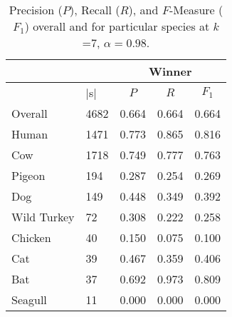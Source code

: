 \begin{table}[t]
\caption{Precision ($P$), Recall ($R$), and $F$-Measure ($F_1$) overall and for particular species at $k$=7, $\alpha=0.98$.}
\begin{tabular}{lllll}
\cline{3-5}
                                    & \multicolumn{1}{l|}{}             & \multicolumn{3}{c|}{Winner} \\ \hline
\multicolumn{1}{|l|}{\Spec{}}     & \multicolumn{1}{l|}{$|$\Isol{}s$|$} & \multicolumn{1}{c}{$P$} & \multicolumn{1}{c}{$R$} & \multicolumn{1}{c|}{$F_1$} \\ \hline
\multicolumn{1}{|l|}{Overall}       & \multicolumn{1}{l|}{4682}         & 0.664 & 0.664 & \multicolumn{1}{l|}{0.664} \\
\multicolumn{1}{|l|}{Human}         & \multicolumn{1}{l|}{1471}         & 0.773 & 0.865 & \multicolumn{1}{l|}{0.816} \\
\multicolumn{1}{|l|}{Cow}           & \multicolumn{1}{l|}{1718}         & 0.749 & 0.777 & \multicolumn{1}{l|}{0.763} \\
\multicolumn{1}{|l|}{Pigeon}        & \multicolumn{1}{l|}{194}          & 0.287 & 0.254 & \multicolumn{1}{l|}{0.269} \\
\multicolumn{1}{|l|}{Dog}           & \multicolumn{1}{l|}{149}          & 0.448 & 0.349 & \multicolumn{1}{l|}{0.392} \\
\multicolumn{1}{|l|}{Wild Turkey}   & \multicolumn{1}{l|}{72}           & 0.308 & 0.222 & \multicolumn{1}{l|}{0.258} \\
\multicolumn{1}{|l|}{Chicken}       & \multicolumn{1}{l|}{40}           & 0.150 & 0.075 & \multicolumn{1}{l|}{0.100} \\
\multicolumn{1}{|l|}{Cat}           & \multicolumn{1}{l|}{39}           & 0.467 & 0.359 & \multicolumn{1}{l|}{0.406} \\
\multicolumn{1}{|l|}{Bat}           & \multicolumn{1}{l|}{37}           & 0.692 & 0.973 & \multicolumn{1}{l|}{0.809} \\
\multicolumn{1}{|l|}{Seagull}       & \multicolumn{1}{l|}{11}           & 0.000 & 0.000 & \multicolumn{1}{l|}{0.000} \\ \hline
\end{tabular}



\end{table}
